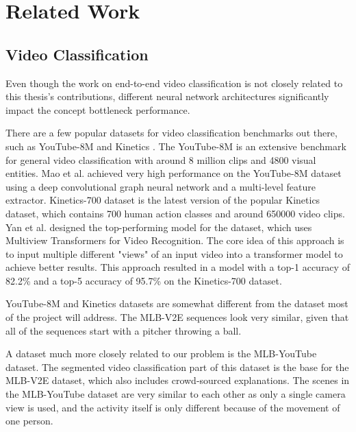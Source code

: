 \chapter{Related Work}

\section{Video Classification}
\label{video-classification}

Even though the work on end-to-end video classification is not closely related to this thesis's contributions, different neural network architectures significantly impact the concept bottleneck performance.

There are a few popular datasets for video classification benchmarks out there, such as YouTube-8M \cite{RefWorks:RefID:10-abu-el-haija2016youtube-8m:} and Kinetics \cite{RefWorks:RefID:9-carreira2017quo}.
The YouTube-8M \cite{RefWorks:RefID:10-abu-el-haija2016youtube-8m:} is an extensive benchmark for general video classification with around 8 million clips and 4800 visual entities.
Mao et al. \cite{RefWorks:RefID:4-mao2019hierarchical} achieved very high performance on the YouTube-8M dataset using a deep convolutional graph neural network and a multi-level feature extractor.
Kinetics-700 \cite{RefWorks:RefID:14-carreira2019short} dataset is the latest version of the popular Kinetics dataset, which contains 700 human action classes and around 650000 video clips.
Yan et al. designed the top-performing model for the dataset, \cite{RefWorks:RefID:8-yan2022multiview} which uses Multiview Transformers for Video Recognition. 
The core idea of this approach is to input multiple different "views" of an input video into a transformer model to achieve better results.
This approach resulted in a model with a top-1 accuracy of 82.2\% and a top-5 accuracy of 95.7\% on the Kinetics-700 dataset.

YouTube-8M and Kinetics datasets are somewhat different from the dataset most of the project will address.
The MLB-V2E sequences look very similar, given that all of the sequences start with a pitcher throwing a ball.

A dataset much more closely related to our problem is the MLB-YouTube \cite{RefWorks:RefID:3-piergiovanni2018fine-grained} dataset.
The segmented video classification part of this dataset is the base for the MLB-V2E \cite{RefWorks:RefID:16-2021automatic} dataset, which also includes crowd-sourced explanations. 
The scenes in the MLB-YouTube dataset are very similar to each other as only a single camera view is used, and the activity itself is only different because of the movement of one person.

